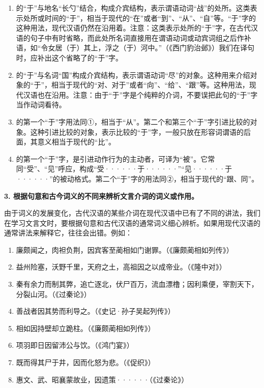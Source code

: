 \begin{enumerate}[label=\textcircled{\arabic*}]
	\item 的“于”与地名“长勺”结合，构成介宾结构，表示谓语动词“战”的处所。这类表示处所或时间的“于”，相当于现代的“在”或者“到”、“从”、“自”等。“于”字的这种用法，现代汉语仍然在沿用着。注意：这类表示处所的“于”字，在古代汉语的句子中有时省略，而此处所名词直接用在谓语动词或动宾词组之后作补语，如“令女居（于）其上，浮之（于）河中。”（《西门豹治邺》）我们在译句时，应补出这个省略了的“于”字。
	\item 的“于”与名词“国”构成介宾结构，表示谓语动词“尽”的对象。这种用来介绍对象的“于”，相当于现代的“对、对于”或者“向”、“给”、“跟”等。这种用法，现代汉语也在沿用。注意：由于“于”字是个纯粹的介词，不要误把此句的“于”字当作动词看待。
	\item 的第一个“于”字用法同①，相当于“从”。第二个和第三个“于”字引进比较的对象。这种引进比较的对象，表示比较的“于”字，一般只放在形容词谓语的后面，其意义相当于现代的“比”。
	\item 的第一个“于”字，是引进动作行为的主动者，可译为“被”。它常同“受”、“见”呼应，构成“受······于······”“见······于······”的被动格式。第二个“于”字的用法同②，相当于现代的“跟、同”。
\end{enumerate}

\textbf{3. 根据句意和古今词义的不同来辨析文言介词的词义或作用。}

由于词义的发展变化，古代汉语的某些介词在现代汉语中已有了不同的讲法，我们在学习文言文时，要根据句意和古代汉语的通常词义细心辨析。如果用现代汉语的通常讲法来解释它，往往会出错。例如：

\noindent
[\ 因\ ]
\begin{enumerate}[label=\textcircled{\arabic*}]
	\item 廉颇闻之，肉袒负荆，因宾客至蔺相如门谢罪。（《廉颇蔺相如列传》）
	\item 益州险塞，沃野千里，天府之土，高祖因之以成帝业。（《隆中对》）
	\item 秦有余力而制其弊，追亡逐北，伏尸百万，流血漂橹；因利乘便，宰割天下，分裂山河。（《过秦论》）
	\item 善战者因其势而利导之。（《史记·孙子吴起列传》）
	\item 相如因持壁却立跪柱。（《廉颇蔺相如列传》）
	\item 项羽即日因留沛公与饮。（《鸿门宴》）
	\item 既而得其尸于井，因而化怒为悲。（《促织》）
	\item 惠文、武、昭襄蒙故业，因遗策······（《过秦论》）
\end{enumerate}


